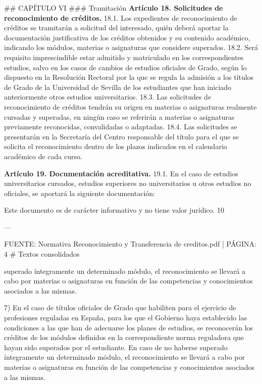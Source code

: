 \documentclass{article}
\begin{document}
\begin{itemize}
\begin{itemize}
\begin{scriptsize}
                  \#\# CAPÍTULO VI
                  \#\#\# Tramitación
                  \textbf{Artículo 18. Solicitudes de reconocimiento de créditos.}
                  18.1. Los expedientes de reconocimiento de créditos se tramitarán a solicitud del interesado, quién deberá aportar la documentación justificativa de los créditos obtenidos y su contenido académico, indicando los módulos, materias o asignaturas que considere superados.
                  18.2. Será requisito imprescindible estar admitido y matriculado en los correspondientes estudios, salvo en los casos de cambios de estudios oficiales de Grado, según lo dispuesto en la Resolución Rectoral por la que se regula la admisión a los títulos de Grado de la Universidad de Sevilla de los estudiantes que han iniciado anteriormente otros estudios universitarios.
                  18.3. Las solicitudes de reconocimiento de créditos tendrán su origen en materias o asignaturas realmente cursadas y superadas, en ningún caso se referirán a materias o asignaturas previamente reconocidas, convalidadas o adaptadas.
                  18.4. Las solicitudes se presentarán en la Secretaría del Centro responsable del título para el que se solicita el reconocimiento dentro de los plazos indicados en el calendario académico de cada curso.

                  \textbf{Artículo 19. Documentación acreditativa.}
                  19.1. En el caso de estudios universitarios cursados, estudios superiores no universitarios u otros estudios no oficiales, se aportará la siguiente documentación:

                  Este documento es de carácter informativo y no tiene valor jurídico.
                  10

                  ---

                  FUENTE: Normativa Reconocimiento y Transferencia de creditos.pdf | PÁGINA: 4
                  \# Textos consolidados

                  superado íntegramente un determinado módulo, el reconocimiento se llevará a cabo por materias o asignaturas en función de las competencias y conocimientos asociados a las mismas.

                  7) En el caso de títulos oficiales de Grado que habiliten para el ejercicio de profesiones reguladas en España, para los que el Gobierno haya establecido las condiciones a las que han de adecuarse los planes de estudios, se reconocerán los créditos de los módulos definidos en la correspondiente norma reguladora que hayan sido superados por el estudiante. En caso de no haberse superado íntegramente un determinado módulo, el reconocimiento se llevará a cabo por materias o asignaturas en función de las competencias y conocimientos asociados a las mismas.


\end{scriptsize}
\end{itemize}
\end{itemize}
\end{document}

